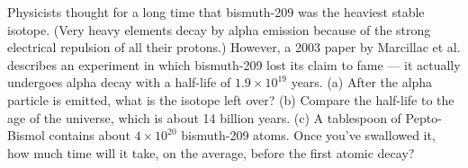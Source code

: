 Physicists thought for a long time that bismuth-209 was
the heaviest stable isotope. (Very heavy elements decay by
alpha emission because of the strong electrical repulsion of
all their protons.) However, a 2003 paper by Marcillac et
al. describes an experiment in which bismuth-209 lost its
claim to fame --- it actually undergoes alpha decay with a
half-life of $1.9\times10^{19}$  years.\hwendpart
(a) After the alpha particle is emitted, what is the isotope left over?\hwendpart
(b) Compare the half-life to the age of the universe, which
is about 14 billion years.\hwendpart
(c) A tablespoon of Pepto-Bismol contains about $4\times10^{20}$
bismuth-209 atoms. Once you've swallowed it, how much time
will it take, on the average, before the first atomic decay?\answercheck\hwendpart
